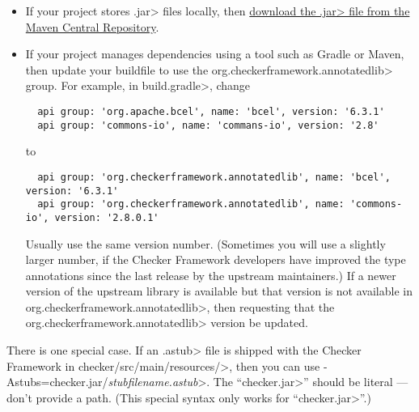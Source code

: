 \begin{itemize}
\item
If your project stores \<.jar> files locally, then
\href{https://search.maven.org/search?q=org.checkerframework.annotatedlib}{download
  the \<.jar> file from the Maven Central Repository}.

\item
If your project manages dependencies using a tool such as Gradle or Maven,
then update your buildfile to use the \<org.checkerframework.annotatedlib>
group.  For example, in \<build.gradle>, change

\begin{Verbatim}
  api group: 'org.apache.bcel', name: 'bcel', version: '6.3.1'
  api group: 'commons-io', name: 'commans-io', version: '2.8'
\end{Verbatim}

\noindent
to

\begin{Verbatim}
  api group: 'org.checkerframework.annotatedlib', name: 'bcel', version: '6.3.1'
  api group: 'org.checkerframework.annotatedlib', name: 'commons-io', version: '2.8.0.1'
\end{Verbatim}

\noindent
Usually use the same version number.  (Sometimes you will use a slightly larger
number, if the Checker Framework developers have improved the type
annotations since the last release by the upstream maintainers.)  If a
newer version of the upstream library is available but that version is not
available in \<org.checkerframework.annotatedlib>, then
 requesting that the
\<org.checkerframework.annotatedlib> version be updated.
\end{itemize}


There is one special case.  If an \<.astub> file is shipped with the
Checker Framework in \<checker/src/main/resources/>, then you can
use \<-Astubs=checker.jar/\emph{stubfilename.astub}>.
The ``\<checker.jar>'' should be literal --- don't provide a path.
(This special syntax only works for ``\<checker.jar>''.)


